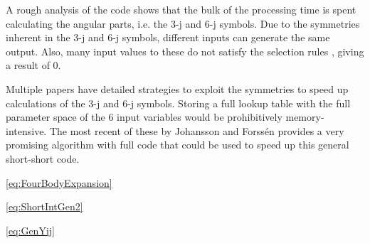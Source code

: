 \documentclass[Dissertation.tex]{subfiles}
\begin{document}
A rough analysis of the code shows that the bulk of the processing time is 
spent calculating the angular parts, i.e. the 3-j and 6-j symbols. Due to the 
symmetries inherent in the 3-j and 6-j symbols, different inputs can generate 
the same output. Also, many input values to these do not satisfy the 
selection rules \cite[p.1054-1064]{Messiah1999} \cite{Edmonds1996},
giving a result of 0.

Multiple papers \cite{Luscombe1998,Wei1998,Rasch2003,Johansson2015} have
detailed strategies to exploit the symmetries to speed up calculations of the
3-j and 6-j symbols. Storing a full lookup table with the full parameter
space of the 6 input variables would be prohibitively memory-intensive.
The most recent of these by Johansson and Forss{\'{e}}n \cite{Johansson2015}
provides a very promising algorithm with full code that could be used to speed
up this general short-short code.



\cref{eq:FourBodyExpansion}

\cref{eq:ShortIntGen2}

\cref{eq:GenYij}





\biblio
\end{document}
